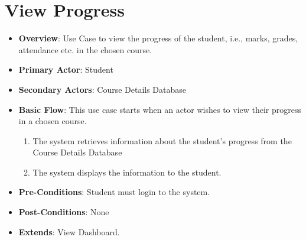\documentclass[12pt, a4]{report}
\begin{document}

\section{View Progress}
\begin{itemize}
    \item \textbf{Overview}: Use Case to view the progress of the student, i.e., marks, grades, attendance etc. in the chosen course.
    \item \textbf{Primary Actor}: Student
    \item \textbf{Secondary Actors}: Course Details Database
    \item \textbf{Basic Flow}: This use case starts when an actor wishes to view their progress in a chosen course.
        \begin{enumerate}
            \item The system retrieves information about the student's progress from the Course Details Database
            \item The system displays the information to the student.
        \end{enumerate}
    \item \textbf{Pre-Conditions}: Student must login to the system.
    \item \textbf{Post-Conditions}: None
    \item \textbf{Extends}: View Dashboard.
\end{itemize}


\end{document}
